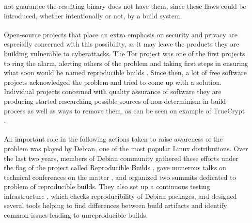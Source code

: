{not guarantee the resulting binary does not have them, since these flaws could be introduced,
whether intentionally or not, by a build system. \\\\
Open-source projects that place an extra emphasis on security
and privacy are especially concerned with this possibility, as
it may leave the products they are building vulnerable to cyberattacks.
The Tor project was one of the first projects to ring the alarm, alerting others of the problem and taking first steps
in ensuring what soon would be named reproducible builds \autocite{tor13, tor14}.
Since then, a lot of free software projects acknowledged the problem and
tried to come up with a solution. Individual projects concerned with quality
assurance of software they are producing started researching possible sources of
non-determinism in build process as well as ways to remove them, as can be
seen on example of TrueCrypt \autocite{de2014challenges}.\\\\
An important role in the following actions taken to raise awareness of the
problem was played by Debian, one of the most popular Linux distributions.
Over the last two years, members of Debian community gathered these efforts
under the flag of the project called Reproducible Builds \autocite{rb},
gave numerous talks on technical conferences on the matter
\autocite{Lun14, lca2017_valerie}, and organized
two summits dedicated to problem of reproducible builds. They also set up a continuous
testing infrastructure \autocite{tests-rbo}, which checks reproducibility
of Debian packages, and designed several tools helping to find
differences between build artifacts and identify common issues leading to
unreproducible builds.}
